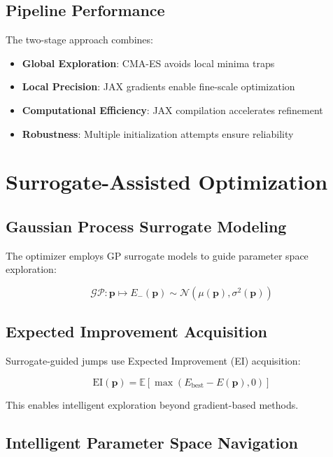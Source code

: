 \documentclass[11pt,a4paper]{article}
\begin{document}
\subsection{Pipeline Performance}

The two-stage approach combines:
\begin{itemize}
\item \textbf{Global Exploration}: CMA-ES avoids local minima traps
\item \textbf{Local Precision}: JAX gradients enable fine-scale optimization
\item \textbf{Computational Efficiency}: JAX compilation accelerates refinement
\item \textbf{Robustness}: Multiple initialization attempts ensure reliability
\end{itemize}

\section{Surrogate-Assisted Optimization}

\subsection{Gaussian Process Surrogate Modeling}

The optimizer employs GP surrogate models to guide parameter space exploration:

\begin{equation}
\mathcal{GP}: \mathbf{p} \mapsto E_-(\mathbf{p}) \sim \mathcal{N}(\mu(\mathbf{p}), \sigma^2(\mathbf{p}))
\end{equation}

\subsection{Expected Improvement Acquisition}

Surrogate-guided jumps use Expected Improvement (EI) acquisition:

\begin{equation}
\text{EI}(\mathbf{p}) = \mathbb{E}[\max(E_{\text{best}} - E(\mathbf{p}), 0)]
\end{equation}

This enables intelligent exploration beyond gradient-based methods.

\subsection{Intelligent Parameter Space Navigation}
\end{document}
